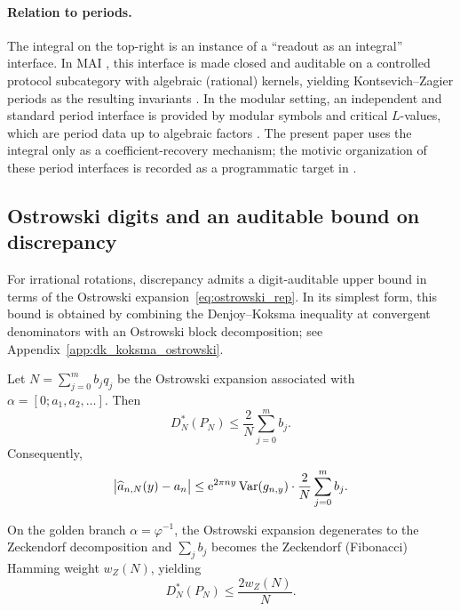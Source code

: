 \paragraph{Relation to periods.}
The integral on the top-right is an instance of a ``readout as an integral'' interface. In MAI \cite{Ma2025MAI}, this interface is made closed and auditable on a controlled protocol subcategory with algebraic (rational) kernels, yielding Kontsevich--Zagier periods as the resulting invariants \cite{KontsevichZagier2001}. In the modular setting, an independent and standard period interface is provided by modular symbols and critical $L$-values, which are period data up to algebraic factors \cite{Shimura1971,Deligne1979}. The present paper uses the integral only as a coefficient-recovery mechanism; the motivic organization of these period interfaces is recorded as a programmatic target in \cite{Ma2025MAI}.

\subsection{Ostrowski digits and an auditable bound on discrepancy}
\label{sec:ostrowski_discrepancy_bound}

For irrational rotations, discrepancy admits a digit-auditable upper bound in terms of the Ostrowski expansion~\eqref{eq:ostrowski_rep}. In its simplest form, this bound is obtained by combining the Denjoy--Koksma inequality at convergent denominators with an Ostrowski block decomposition; see Appendix~\ref{app:dk_koksma_ostrowski}.

\begin{corollary}
\label{cor:ostrowski_digit_discrepancy}
Let $N=\sum_{j=0}^{m} b_j q_j$ be the Ostrowski expansion associated with $\alpha=[0;a_1,a_2,\dots]$. Then
\begin{equation}
\label{eq:ostrowski_discrepancy_bound}
D_N^\ast(P_N)\le \frac{2}{N}\sum_{j=0}^{m} b_j.
\end{equation}
Consequently,
\begin{equation}
\big|\widehat a_{n,N}(y)-a_n\big|
\le \mathrm{e}^{2\pi n y}\,\mathrm{Var}(g_{n,y})\cdot \frac{2}{N}\sum_{j=0}^{m} b_j.
\end{equation}
\end{corollary}

\begin{remark}
On the golden branch $\alpha=\varphi^{-1}$, the Ostrowski expansion degenerates to the Zeckendorf decomposition and $\sum_j b_j$ becomes the Zeckendorf (Fibonacci) Hamming weight $w_Z(N)$, yielding
\begin{equation}
D_N^\ast(P_N)\le \frac{2w_Z(N)}{N}.
\end{equation}
\end{remark}

